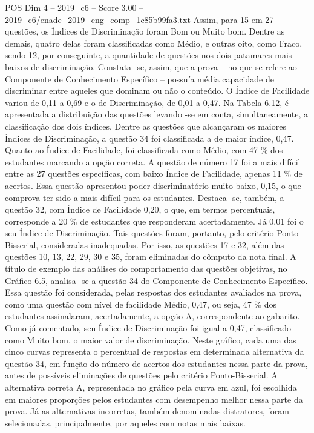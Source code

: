 \begin{textsample}{POS Dim 4 – 2019\_c6 – Score 3.00 – 2019\_c6/enade\_2019\_eng\_comp\_1c85b99fa3.txt}
Assim, para 15 em 27 questões, os Índices de Discriminação foram Bom ou Muito bom.
Dentre as demais, quatro delas foram classificadas como Médio, e outras oito, como Fraco, sendo 12, por conseguinte, a quantidade de questões nos dois patamares mais baixos de discriminação.
Constata -se, assim, que a prova – no que se refere ao Componente de Conhecimento Específico – possuía média capacidade de discriminar entre aqueles que dominam ou não o conteúdo.
O Índice de Facilidade variou de 0,11 a 0,69 e o de Discriminação, de 0,01 a 0,47.
Na Tabela 6.12, é apresentada a distribuição das questões levando -se em conta, simultaneamente, a classificação dos dois índices.
Dentre as questões que alcançaram os maiores Índices de Discriminação, a questão 34 foi classificada a de maior índice, 0,47.
Quanto ao Índice de Facilidade, foi classificada como Médio, com 47 \% dos estudantes marcando a opção correta.
A questão de número 17 foi a mais difícil entre as 27 questões específicas, com baixo Índice de Facilidade, apenas 11 \% de acertos.
Essa questão apresentou poder discriminatório muito baixo, 0,15, o que comprova ter sido a mais difícil para os estudantes.
Destaca -se, também, a questão 32, com Índice de Facilidade 0,20, o que, em termos percentuais, corresponde a 20 \% de estudantes que responderam acertadamente.
Já 0,01 foi o seu Índice de Discriminação.
Tais questões foram, portanto, pelo critério Ponto-Bisserial, consideradas inadequadas.
Por isso, as questões 17 e 32, além das questões 10, 13, 22, 29, 30 e 35, foram eliminadas do cômputo da nota final.
A título de exemplo das análises do comportamento das questões objetivas, no Gráfico 6.5, analisa -se a questão 34 do Componente de Conhecimento Específico.
Essa questão foi considerada, pelas respostas dos estudantes avaliados na prova, como uma questão com nível de facilidade Médio, 0,47, ou seja, 47 \% dos estudantes assinalaram, acertadamente, a opção A, correspondente ao gabarito.
Como já comentado, seu Índice de Discriminação foi igual a 0,47, classificado como Muito bom, o maior valor de discriminação.
Neste gráfico, cada uma das cinco curvas representa o percentual de respostas em determinada alternativa da questão 34, em função do número de acertos dos estudantes nessa parte da prova, antes de possíveis eliminações de questões pelo critério Ponto-Bisserial.
A alternativa correta A, representada no gráfico pela curva em azul, foi escolhida em maiores proporções pelos estudantes com desempenho melhor nessa parte da prova.
Já as alternativas incorretas, também denominadas distratores, foram selecionadas, principalmente, por aqueles com notas mais baixas.

\end{textsample}
